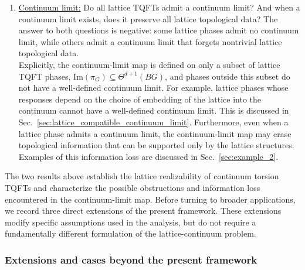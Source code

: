 \documentclass[aps,prx,reprint,superscriptaddress,twocolumn,amsmath,amssymb,amsfonts, nofootinbib]{revtex4-2}
\theoremstyle{apsstyle}
\begin{document}
\begin{enumerate}
    These two results are established in App.~\ref{app:lift}, (Lemma~\ref{lemma:lift_quillen}), and App.~\ref{app:symm_ring}(Claim~2), respectively. \\
    \noindent Together, Eqs.~\eqref{eq:disc1} and~\eqref{eq:disc2} show that the restriction of a continuum phase $[x]\in\Theta^{d+1}(B\mathrm{O}(d))$ to $E_{\mathrm{max}}$ retains enough information to reconstruct the original continuum phase uniquely. Thus, every continuum TQFT phase admits a single $E_{\mathrm{max}}$-symmetric lattice representative that captures all of its topological data at once.
    \item \underline{Continuum limit:} Do all lattice TQFTs admit a continuum limit? And when a continuum limit exists, does it preserve all lattice topological data? The answer to both questions is negative: some lattice phases admit no continuum limit, while others admit a continuum limit that forgets nontrivial lattice topological data.\\
    Explicitly, the continuum-limit map is defined on only a subset of lattice TQFT phases, $\mathrm{Im}(\pi_G)\subseteq\Theta^{d+1}(BG)$, and phases outside this subset do not have a well-defined continuum limit. For example, lattice phases whose responses depend on the choice of embedding of the lattice into the continuum cannot have a well-defined continuum limit. This is discussed in Sec.~\ref{sec:lattice_compatible_continuum_limit}. Furthermore, even when a lattice phase admits a continuum limit, the continuum-limit map may erase topological information that can be supported only by the lattice structures. Examples of this information loss are discussed in Sec.~\ref{sec:example_2}.
\end{enumerate}


\noindent The two results above establish the lattice realizability of continuum torsion TQFTs and characterize the possible obstructions and information loss encountered in the continuum-limit map. Before turning to broader applications, we record three direct extensions of the present framework. These extensions modify specific assumptions used in the analysis, but do not require a fundamentally different formulation of the lattice-continuum problem.

\subsubsection{Extensions and cases beyond the present framework}
\label{sec:discussion_extension}
\end{document}
